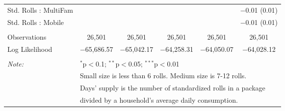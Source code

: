 \begin{table}[!htbp]
\begin{tabular}{@{\extracolsep{5pt}}lccccc}
  Std. Rolls : MultiFam &  &  &  &  & $-$0.01 (0.01) \\ 
  Std. Rolls : Mobile &  &  &  &  & $-$0.01 (0.01) \\ 
 \hline \\[-1.8ex] 
Observations & 26,501 & 26,501 & 26,501 & 26,501 & 26,501 \\ 
Log Likelihood & $-$65,686.57 & $-$65,042.17 & $-$64,258.31 & $-$64,050.07 & $-$64,028.12 \\ 
\hline 
\hline \\[-1.8ex] 
\textit{Note:}  & \multicolumn{5}{l}{$^{*}$p$<$0.1; $^{**}$p$<$0.05; $^{***}$p$<$0.01} \\ 
 & \multicolumn{5}{l}{Small size is less than 6 rolls. Medium size is 7-12 rolls. } \\ 
 & \multicolumn{5}{l}{Days' supply is the number of standardized rolls in a package} \\ 
 & \multicolumn{5}{l}{divided by a household's average daily consumption.} \\ 
\end{tabular} 
\end{table} 
